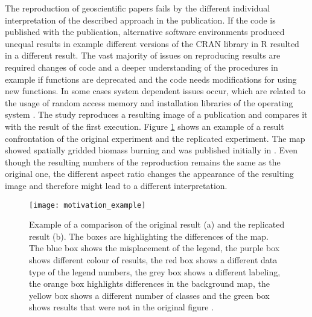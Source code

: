\documentclass[draft,final]{vutinfth} %
\begin{document}
The reproduction of geoscientific papers fails by the different individual interpretation of the described approach in the publication. If the code is published with the publication, alternative software environments produced unequal results in example different versions of the CRAN library in R resulted in a different result. The vast majority of issues on reproducing results are required changes of code and a deeper understanding of the procedures in example if functions are deprecated and the code needs modifications for using new functions. In some cases system dependent issues occur, which are related to the usage of random access memory and installation libraries of the operating system \cite{Thestateofreproducibility}. The study reproduces a resulting image of a publication and compares it with the result of the first execution. Figure \ref{fig:motivation} shows an example of a result confrontation of the original experiment and the replicated experiment. The map showed spatially gridded biomass burning and was published initially in \cite{bg-13-3225-2016}. Even though the resulting numbers of the reproduction remains the same as the original one, the different aspect ratio changes the appearance of the resulting image and therefore might lead to a different interpretation.

\begin{figure}[h]
	\centering
	\texttt{[image: motivation\_example]}
	\caption{Example of a comparison of the original result (a) and the replicated result (b). The boxes are highlighting the differences of the map. The blue box shows the misplacement of the legend, the purple box shows different colour of results, the red box shows a different data type of the legend numbers, the grey box shows a different labeling, the orange box highlights differences in the background map, the yellow box shows a different number of classes and the green box shows results that were not in the original figure \cite{Thestateofreproducibility}.}
	\label{fig:motivation} %
\end{figure} 
\end{document}
